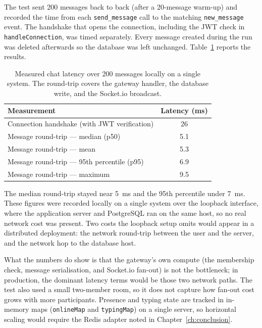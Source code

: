 \documentclass[a4paper,12pt]{report}
\begin{document}
The test sent 200 messages back to back (after a 20-message warm-up) and recorded the time from each \texttt{send\_message} call to the matching \texttt{new\_message} event. The handshake that opens the connection, including the JWT check in \texttt{handleConnection}, was timed separately. Every message created during the run was deleted afterwards so the database was left unchanged. Table~\ref{tab:chat_latency} reports the results.

\begin{table}[H]
\centering
\renewcommand{\arraystretch}{1.2}
\caption[Measured chat latency over 200 messages locally on a single system]{Measured chat latency over 200 messages locally on a single system. The round-trip covers the gateway handler, the database write, and the Socket.io broadcast.}
\label{tab:chat_latency}
\begin{tabular}{|l|c|}
\hline
\textbf{Measurement} & \textbf{Latency (ms)} \\ \hline
Connection handshake (with JWT verification) & 26 \\ \hline
Message round-trip --- median (p50) & 5.1 \\ \hline
Message round-trip --- mean & 5.3 \\ \hline
Message round-trip --- 95th percentile (p95) & 6.9 \\ \hline
Message round-trip --- maximum & 9.5 \\ \hline
\end{tabular}
\end{table}

The median round-trip stayed near 5~ms and the 95th percentile under 7~ms. These figures were recorded locally on a single system over the loopback interface, where the application server and PostgreSQL ran on the same host, so no real network cost was present. Two costs the loopback setup omits would appear in a distributed deployment: the network round-trip between the user and the server, and the network hop to the database host.

What the numbers do show is that the gateway's own compute (the membership check, message serialisation, and Socket.io fan-out) is not the bottleneck; in production, the dominant latency terms would be those two network paths. The test also used a small two-member room, so it does not capture how fan-out cost grows with more participants. Presence and typing state are tracked in in-memory maps (\texttt{onlineMap} and \texttt{typingMap}) on a single server, so horizontal scaling would require the Redis adapter noted in Chapter~\ref{ch:conclusion}.
\end{document}

